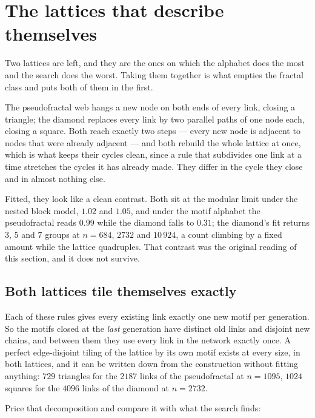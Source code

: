 \section{The lattices that describe themselves}
\label{sec:gr-square}

Two lattices are left, and they are the ones on which the alphabet does the most
and the search does the worst. Taking them together is what empties the fractal
class and puts both of them in the first.

The pseudofractal web hangs a new node on both ends of every link, closing a
triangle; the diamond replaces every link by two parallel paths of one node each,
closing a square. Both reach exactly two steps --- every new node is adjacent to
nodes that were already adjacent --- and both rebuild the whole lattice at once,
which is what keeps their cycles clean, since a rule that subdivides one link at a
time stretches the cycles it has already made. They differ in the cycle they
close and in almost nothing else.

Fitted, they look like a clean contrast. Both sit at the modular limit under the
nested block model, $1.02$ and $1.05$, and under the motif alphabet the
pseudofractal reads $0.99$ while the diamond falls to $0.31$; the diamond's fit
returns $3$, $5$ and $7$ groups at $n=684$, $2732$ and $10\,924$, a count
climbing by a fixed amount while the lattice quadruples. That contrast was the
original reading of this section, and it does not survive.

\subsection*{Both lattices tile themselves exactly}

Each of these rules gives every existing link exactly one new motif per
generation. So the motifs closed at the \emph{last} generation have distinct old
links and disjoint new chains, and between them they use every link in the
network exactly once. A perfect edge-disjoint tiling of the lattice by its own
motif exists at every size, in both lattices, and it can be written down from the
construction without fitting anything: $729$ triangles for the $2187$ links of
the pseudofractal at $n=1095$, $1024$ squares for the $4096$ links of the diamond
at $n=2732$.

Price that decomposition and compare it with what the search finds:

